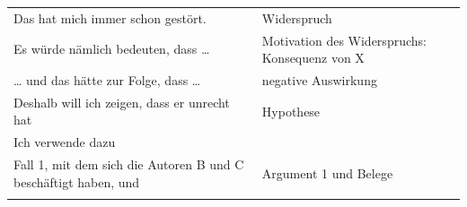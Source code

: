 \documentclass[]{book}
\theoremstyle{definition}
\theoremstyle{definition}
\theoremstyle{definition}
\theoremstyle{remark}
\begin{document}
\begin{longtable}[]{@{}ll@{}}
\begin{minipage}[t]{0.51\columnwidth}
Das hat mich immer schon gestört.\strut
\end{minipage} & \begin{minipage}[t]{0.43\columnwidth}\raggedright\strut
Widerspruch \vspace{-6mm}\strut
\end{minipage}\tabularnewline
\begin{minipage}[t]{0.51\columnwidth}\raggedright\strut
Es würde nämlich bedeuten, dass \ldots{}\strut
\end{minipage} & \begin{minipage}[t]{0.43\columnwidth}\raggedright\strut
Motivation des Widerspruchs: Konsequenz von X \vspace{-6mm}\strut
\end{minipage}\tabularnewline
\begin{minipage}[t]{0.51\columnwidth}\raggedright\strut
\ldots{} und das hätte zur Folge, dass \ldots{}\strut
\end{minipage} & \begin{minipage}[t]{0.43\columnwidth}\raggedright\strut
negative Auswirkung\vspace{-6mm}\strut
\end{minipage}\tabularnewline
\begin{minipage}[t]{0.51\columnwidth}\raggedright\strut
Deshalb will ich zeigen, dass er unrecht hat\strut
\end{minipage} & \begin{minipage}[t]{0.43\columnwidth}\raggedright\strut
Hypothese\vspace{-6mm}\strut
\end{minipage}\tabularnewline
\begin{minipage}[t]{0.51\columnwidth}\raggedright\strut
Ich verwende dazu\strut
\end{minipage} & \begin{minipage}[t]{0.43\columnwidth}\raggedright\strut
\vspace{-6mm}\strut
\end{minipage}\tabularnewline
\begin{minipage}[t]{0.51\columnwidth}\raggedright\strut
Fall 1, mit dem sich die Autoren B und C beschäftigt haben, und\strut
\end{minipage} & \begin{minipage}[t]{0.43\columnwidth}\raggedright\strut
Argument 1 und Belege\vspace{-6mm}\strut
\end{minipage}\tabularnewline
\begin{minipage}[t]{0.51\columnwidth}\raggedright\strut

\end{minipage}
\end{longtable}
\end{document}
